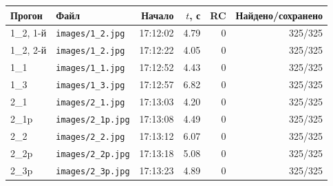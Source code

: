 \begin{tabular}{@{}llrrrr@{}}
\toprule
Прогон & Файл & Начало & $t$, с & RC & Найдено/сохранено \\
\midrule
1\_2, 1-й & \texttt{images/1\_2.jpg} & 17:12:02 & \num{4.79} & 0 & 325/325 \\
1\_2, 2-й & \texttt{images/1\_2.jpg} & 17:12:22 & \num{4.05} & 0 & 325/325 \\
1\_1 & \texttt{images/1\_1.jpg} & 17:12:52 & \num{4.43} & 0 & 325/325 \\
1\_3 & \texttt{images/1\_3.jpg} & 17:12:57 & \num{6.82} & 0 & 325/325 \\
2\_1 & \texttt{images/2\_1.jpg} & 17:13:03 & \num{4.20} & 0 & 325/325 \\
2\_1p & \texttt{images/2\_1p.jpg} & 17:13:08 & \num{4.49} & 0 & 325/325 \\
2\_2 & \texttt{images/2\_2.jpg} & 17:13:12 & \num{6.07} & 0 & 325/325 \\
2\_2p & \texttt{images/2\_2p.jpg} & 17:13:18 & \num{5.08} & 0 & 325/325 \\
2\_3p & \texttt{images/2\_3p.jpg} & 17:13:23 & \num{4.89} & 0 & 325/325 \\
\bottomrule
\end{tabular}
